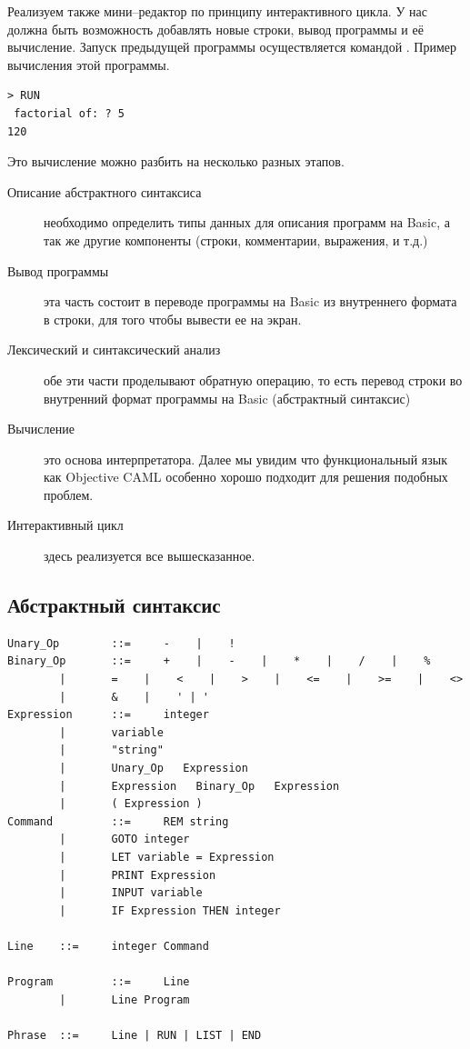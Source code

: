 Реализуем также мини–редактор по принципу интерактивного цикла. У нас должна 
быть возможность добавлять новые строки, вывод программы и её вычисление. 
Запуск предыдущей программы осуществляется командой . Пример 
вычисления этой программы.

\begin{lstlisting}
> RUN
 factorial of: ? 5
120
\end{lstlisting}

Это вычисление можно разбить на несколько разных этапов.

\begin{description}
	\item[Описание абстрактного синтаксиса]

	необходимо определить типы данных для описания программ на Basic, а так же 
другие компоненты (строки, комментарии, выражения, и т.д.)

	\item[Вывод программы]

	эта часть состоит в переводе программы на Basic из внутреннего формата в 
строки, для того чтобы вывести ее на экран.

	\item[Лексический и синтаксический анализ]

	обе эти части проделывают обратную операцию, то есть перевод строки во 
внутренний формат программы на Basic (абстрактный синтаксис)

	\item[Вычисление]

	это основа интерпретатора. Далее мы увидим что функциональный язык как 
Objective CAML особенно хорошо подходит для решения подобных проблем.

	\item[Интерактивный цикл]

	здесь реализуется все вышесказанное.
\end{description}

\subsection{Абстрактный синтаксис}
\label{subsec:abstract_syntax}

\begin{verbatim}
Unary_Op        ::=     -    |    !
Binary_Op       ::=     +    |    -    |    *    |    /    |    %
        |       =    |    <    |    >    |    <=    |    >=    |    <>
        |       &    |    ' | '
Expression      ::=     integer
        |       variable
        |       "string"
        |       Unary_Op   Expression
        |       Expression   Binary_Op   Expression
        |       ( Expression )
Command         ::=     REM string
        |       GOTO integer
        |       LET variable = Expression
        |       PRINT Expression
        |       INPUT variable
        |       IF Expression THEN integer
 
Line    ::=     integer Command
 
Program         ::=     Line
        |       Line Program
 
Phrase  ::=     Line | RUN | LIST | END
\end{verbatim}

